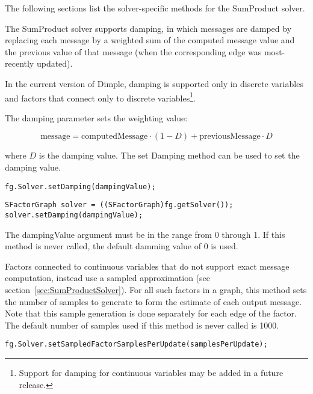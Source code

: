 The following sections list the solver-specific methods for the SumProduct solver.



The SumProduct solver supports damping, in which messages are damped by replacing each message by a weighted sum of the computed message value and the previous value of that message (when the corresponding edge was most-recently updated).

In the current version of Dimple, damping is supported only in discrete variables and factors that connect only to discrete variables\footnote{Support for damping for continuous variables may be added in a future release.}.

The damping parameter sets the weighting value:

\[
\mathrm{message} = \mathrm{computedMessage} \cdot (1 - D) + \mathrm{previousMessage} \cdot D
\]

where $D$ is the damping value.  The set Damping method can be used to set the damping value.

\ifmatlab
\begin{lstlisting}
fg.Solver.setDamping(dampingValue);
\end{lstlisting}
\fi

\ifjava
\begin{lstlisting}
SFactorGraph solver = ((SFactorGraph)fg.getSolver());
solver.setDamping(dampingValue);
\end{lstlisting}
\fi

The dampingValue argument must be in the range from 0 through 1.  If this method is never called, the default damming value of 0 is used.


Factors connected to continuous variables that do not support exact message computation, instead use a sampled approximation (see section~\ref{sec:SumProductSolver}).  For all such factors in a graph, this method sets the number of samples to generate to form the estimate of each output message.  Note that this sample generation is done separately for each edge of the factor.  The default number of samples used if this method is never called is 1000.

\ifmatlab
\begin{lstlisting}
fg.Solver.setSampledFactorSamplesPerUpdate(samplesPerUpdate);
\end{lstlisting}
\fi

